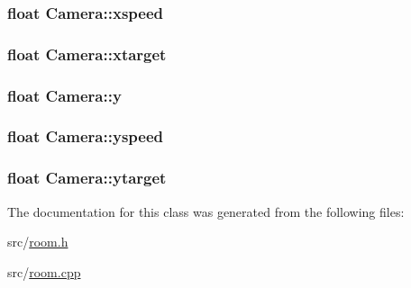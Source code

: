 \hypertarget{class_camera_adfb4a7dd79bcb182a6266a0a66a267ac}{
\subsubsection[{xspeed}]{\setlength{\rightskip}{0pt plus 5cm}float Camera\-::xspeed}}\label{class_camera_adfb4a7dd79bcb182a6266a0a66a267ac}
\hypertarget{class_camera_a316ec47e1e935729d49821ab4aad930e}{
\subsubsection[{xtarget}]{\setlength{\rightskip}{0pt plus 5cm}float Camera\-::xtarget}}\label{class_camera_a316ec47e1e935729d49821ab4aad930e}
\hypertarget{class_camera_ab0522c72fc25c7fa9ad6d0b91e0a3270}{
\subsubsection[{y}]{\setlength{\rightskip}{0pt plus 5cm}float Camera\-::y}}\label{class_camera_ab0522c72fc25c7fa9ad6d0b91e0a3270}
\hypertarget{class_camera_ad504953b5800588a269fc29ca5521523}{
\subsubsection[{yspeed}]{\setlength{\rightskip}{0pt plus 5cm}float Camera\-::yspeed}}\label{class_camera_ad504953b5800588a269fc29ca5521523}
\hypertarget{class_camera_a1265c77bac9fc73e043bc359793b2e61}{
\subsubsection[{ytarget}]{\setlength{\rightskip}{0pt plus 5cm}float Camera\-::ytarget}}\label{class_camera_a1265c77bac9fc73e043bc359793b2e61}


The documentation for this class was generated from the following files\-:\begin{DoxyCompactItemize}
\item 
src/\hyperlink{room_8h}{room.\-h}\item 
src/\hyperlink{room_8cpp}{room.\-cpp}\end{DoxyCompactItemize}
